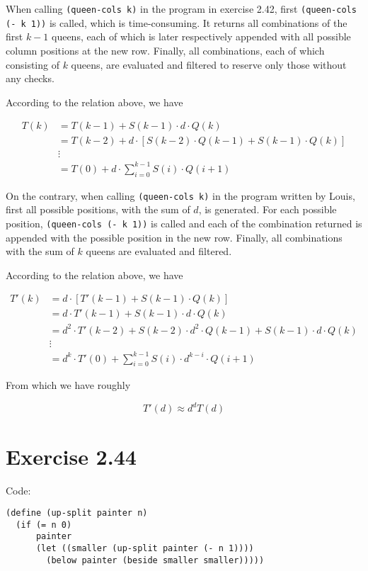 \documentclass[../main.tex]{subfiles}
\begin{document}
When calling \lstinline{(queen-cols k)} in the
 program in exercise 2.42, first \lstinline{(queen-cols (- k 1))}
 is called, which is time-consuming.
 It returns all combinations of the first $k-1$
 queens, each of which is later respectively appended
 with all possible column positions at the new row.
 Finally, all combinations, each of which consisting
 of $k$ queens, are evaluated and filtered to reserve
 only those without any checks.

According to the relation above, we have

\begin{align*}
T(k) &= T(k-1) + S(k-1) \cdot d \cdot Q(k) \\
&= T(k-2) + d \cdot \left[S(k-2) \cdot Q(k-1) + S(k-1) \cdot Q(k)\right] \\
&\vdots \\
&= T(0) + d \cdot \sum_{i=0}^{k-1} S(i) \cdot Q(i+1)
\end{align*}

On the contrary, when calling \lstinline{(queen-cols k)}
 in the program written by Louis, first all possible
 positions, with the sum of $d$, is generated. For each
 possible position, \lstinline{(queen-cols (- k 1))} is
 called and each of the combination returned is appended
 with the possible position in the new row. Finally,
 all combinations with the sum of $k$ queens are evaluated
 and filtered.

According to the relation above, we have

\begin{align*}
T'(k) &= d \cdot \left[T'(k-1) + S(k-1) \cdot Q(k)\right] \\
&= d \cdot T'(k-1) + S(k-1) \cdot d \cdot Q(k) \\
&= d^2 \cdot T'(k-2) + S(k-2) \cdot d^2 \cdot Q(k-1) + S(k-1) \cdot d \cdot Q(k) \\
&\vdots \\
&= d^k \cdot T'(0) + \sum_{i=0}^{k-1} S(i) \cdot d^{k-i} \cdot Q(i + 1)
\end{align*}

From which we have roughly

$$
T'(d) \approx d^d T(d)
$$

\section{Exercise 2.44}

Code:

\begin{lstlisting}
(define (up-split painter n)
  (if (= n 0)
      painter
      (let ((smaller (up-split painter (- n 1))))
        (below painter (beside smaller smaller)))))
\end{lstlisting}
\end{document}

